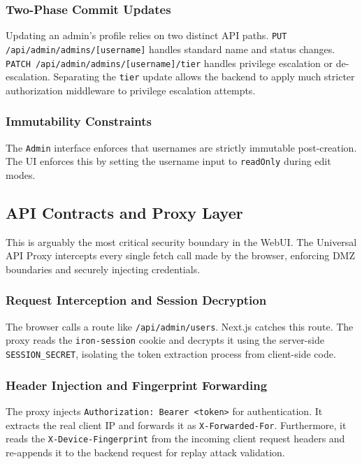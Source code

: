 \subsubsection{Two-Phase Commit Updates}
Updating an admin's profile relies on two distinct API paths. \texttt{PUT /api/admin/admins/[username]} handles standard name and status changes. \texttt{PATCH /api/admin/admins/[username]/tier} handles privilege escalation or de-escalation. Separating the \texttt{tier} update allows the backend to apply much stricter authorization middleware to privilege escalation attempts.

\subsubsection{Immutability Constraints}
The \texttt{Admin} interface enforces that usernames are strictly immutable post-creation. The UI enforces this by setting the username input to \texttt{readOnly} during edit modes.

\subsection{API Contracts and Proxy Layer}
This is arguably the most critical security boundary in the WebUI. The Universal API Proxy intercepts every single fetch call made by the browser, enforcing DMZ boundaries and securely injecting credentials.

\subsubsection{Request Interception and Session Decryption}
The browser calls a route like \texttt{/api/admin/users}. Next.js catches this route. The proxy reads the \texttt{iron-session} cookie and decrypts it using the server-side \texttt{SESSION\_SECRET}, isolating the token extraction process from client-side code.

\subsubsection{Header Injection and Fingerprint Forwarding}
The proxy injects \texttt{Authorization: Bearer <token>} for authentication. It extracts the real client IP and forwards it as \texttt{X-Forwarded-For}. Furthermore, it reads the \texttt{X-Device-Fingerprint} from the incoming client request headers and re-appends it to the backend request for replay attack validation.

